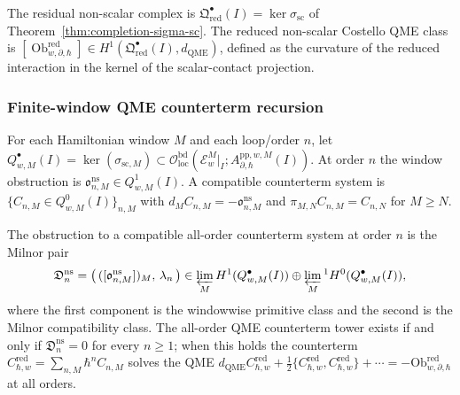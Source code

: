 \begin{defn}
\label{def:completion-residual-nonscalar}
The residual non-scalar complex is
\(\mathfrak Q^\bullet_{\mathrm{red}}(I)=\ker\sigma_{\mathrm{sc}}\)
of Theorem~\ref{thm:completion-sigma-sc}.  The reduced non-scalar
Costello QME class is
\([\operatorname{Ob}^{\mathrm{red}}_{w,\partial,\hbar}]\in
H^1(\mathfrak Q^\bullet_{\mathrm{red}}(I),d_{\mathrm{QME}})\),
defined as the curvature of the reduced interaction in the kernel
of the scalar-contact projection.
\end{defn}

\subsubsection{Finite-window QME counterterm recursion}
\label{sssec:completion-qme-tower-recursion}

\begin{defn}
\label{def:completion-finite-window-residual}
For each Hamiltonian window \(M\) and each loop/order \(n\), let
\(Q^\bullet_{w,M}(I)=\ker(\sigma_{\mathrm{sc},M})\subset
\mathcal O^{\mathrm{bd}}_{\mathrm{loc}}(\mathcal E^M_w|_I;
A^{\mathrm{pp},w,M}_{\partial,\hbar}(I))\).  At order \(n\) the
window obstruction is \(\mathfrak o^{\mathrm{ns}}_{n,M}\in
Q^1_{w,M}(I)\).  A compatible counterterm system is
\(\{C_{n,M}\in Q^0_{w,M}(I)\}_{n,M}\) with
\(d_M C_{n,M}=-\mathfrak o^{\mathrm{ns}}_{n,M}\) and
\(\pi_{M,N}C_{n,M}=C_{n,N}\) for \(M\ge N\).
\end{defn}

\begin{thm}
\label{thm:completion-milnor-obstruction-vector}
The obstruction to a compatible all-order counterterm system at
order \(n\) is the Milnor pair
\[
  \mathfrak D^{\mathrm{ns}}_n
  =\bigl(\,([\mathfrak o^{\mathrm{ns}}_{n,M}])_M,\,\lambda_n\,\bigr)
  \in\varprojlim_M H^1(Q^\bullet_{w,M}(I))
   \oplus\varprojlim_M{}^1H^0(Q^\bullet_{w,M}(I)),
\]
where the first component is the windowwise primitive class and
the second is the Milnor compatibility class.  The all-order QME
counterterm tower exists if and only if
\(\mathfrak D^{\mathrm{ns}}_n=0\) for every \(n\ge 1\); when this
holds the counterterm \(C^{\mathrm{red}}_{\hbar,w}=
\sum_{n,M}\hbar^n C_{n,M}\) solves the QME
\(d_{\mathrm{QME}}C^{\mathrm{red}}_{\hbar,w}+
\tfrac12\{C^{\mathrm{red}}_{\hbar,w},C^{\mathrm{red}}_{\hbar,w}\}+\cdots
=-\mathrm{Ob}^{\mathrm{red}}_{w,\partial,\hbar}\) at all orders.
\end{thm}

